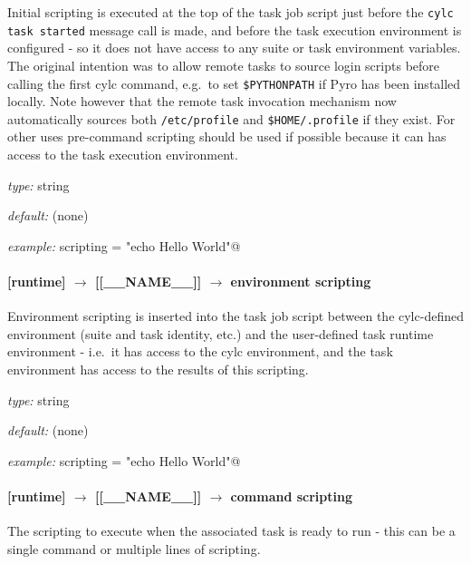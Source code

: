 Initial scripting is executed at the top of the task job script just
before the \lstinline=cylc task started= message call is made, and
before the task execution environment is configured - so it does not
have access to any suite or task environment variables.  The original
intention was to allow remote tasks to source login scripts before
calling the first cylc command, e.g.\ to set \lstinline=$PYTHONPATH= if
Pyro has been installed locally. Note however that the remote task
invocation mechanism now automatically sources both
\lstinline=/etc/profile= and \lstinline=$HOME/.profile= if they exist. 
For other uses pre-command scripting should be used if possible because
it can has access to the task execution environment.
\begin{myitemize}
\item {\em type:} string
\item {\em default:} (none)
\item {\em example:} \lstinline@initial scripting = "echo Hello World"@
\end{myitemize}

\paragraph[environment scripting]{[runtime] $\rightarrow$ [[\_\_NAME\_\_]] $\rightarrow$ environment scripting}

Environment scripting is inserted into the task job script between
the cylc-defined environment (suite and task identity, etc.) and the 
user-defined task runtime environment - i.e.\ it has access to the 
cylc environment, and the task environment has access to the results of
this scripting.
\begin{myitemize}
\item {\em type:} string
\item {\em default:} (none)
\item {\em example:} \lstinline@environment scripting = "echo Hello World"@
\end{myitemize}

\paragraph[command scripting]{[runtime] $\rightarrow$ [[\_\_NAME\_\_]] $\rightarrow$ command scripting}

The scripting to execute when the associated task is ready to run - this
can be a single command or multiple lines of scripting. 

